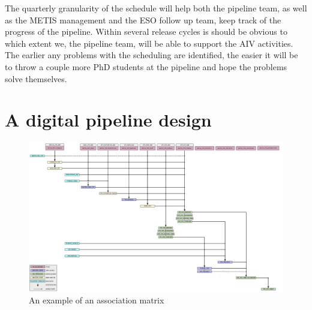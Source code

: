 \documentclass[a4paper]{spie}  %
\begin{document}
The quarterly granularity of the schedule will help both the pipeline team, as well as the METIS management and the ESO follow up team, keep track of the progress of the pipeline. 
Within several release cycles is should be obvious to which extent we, the pipeline team, will be able to support the AIV activities.
The earlier any problems with the scheduling are identified, the easier it will be to throw a couple more PhD students at the pipeline and hope the problems solve themselves.

\section{A digital pipeline design}
\label{sec:pip}

\begin{figure}
    \centering
    \includegraphics[width=\textwidth]{SPIE_paper/figures/metis_ifu_assoc.png}
    \caption{An example of an association matrix }
    \label{fig:assoc_mat_example}
\end{figure}
\end{document}

